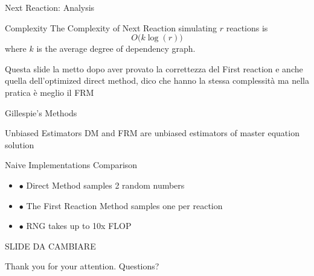 \documentclass{beamer}
\begin{document}

\begin{frame}{Next Reaction: Analysis}
  \begin{block}{Complexity}
    The Complexity of Next Reaction simulating $r$ reactions is
    $$ O\bigl(k \log(r)\bigr) $$
    where $k$ is the average degree of dependency graph.    
  \end{block}
  Questa slide la metto dopo aver provato la correttezza del First reaction e anche quella
  dell'optimized direct method, dico che hanno la stessa complessità ma nella pratica è meglio il FRM
\end{frame}

\begin{frame}{Gillespie's Methods}
  \begin{block}{Unbiased Estimators}
    DM and FRM are unbiased estimators of
    master equation solution

  \end{block}
  \begin{block}{Naive Implementations Comparison}
    \begin{itemize} 
    \item $\bullet$ Direct Method samples 2 random numbers
    \item $\bullet$ The First Reaction Method samples one per reaction 
    \item $\bullet$ RNG takes up to 10x FLOP
    \end{itemize}
  \end{block}
\center \Huge{SLIDE DA CAMBIARE}
\end{frame}

\begin{frame}
  \begin{center}
    \Huge{Thank you for your attention.}
    \Huge{Questions?}
  \end{center}
\end{frame}
\end{document}
